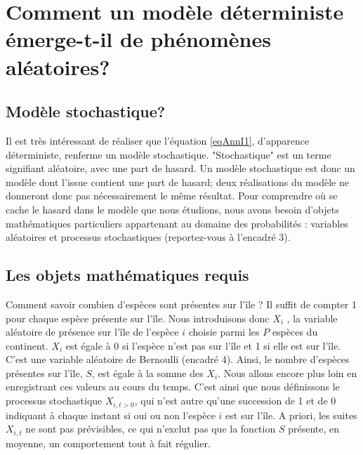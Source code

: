 \section{Comment un modèle déterministe émerge-t-il de phénomènes aléatoires?}

\subsection{Modèle stochastique?}
Il est très intéressant de réaliser que l'équation \eqref{eqAnnI1}, d'apparence déterministe, renferme un modèle stochastique. "Stochastique" est un terme signifiant aléatoire, avec une part de hasard. Un modèle stochastique est donc un modèle dont l'issue contient une part de hasard; deux réalisations du modèle ne donneront donc pas nécessairement le même résultat. Pour comprendre où se cache le hasard dans le modèle que nous étudions, nous avons besoin d'objets mathématiques particuliers appartenant au domaine des probabilités : variables aléatoires et processus stochastiques (reportez-vous à l'encadré 3).

\subsection{Les objets mathématiques requis}
Comment savoir combien d’espèces sont présentes sur l’île ? Il suffit de compter 1 pour chaque espèce présente sur l’île. Nous introduisons donc $X_i$ , la variable aléatoire de présence sur l’île de l’espèce $i$ choisie parmi les $P$ espèces du continent. $X_i$ est égale à 0 si l’espèce n’est pas sur l’île et 1 si elle est sur l’île. C’est une variable aléatoire de Bernoulli (encadré 4). Ainsi, le nombre d’espèces présentes sur l’île, $S$, est égale à la somme des $X_i$. Nous allons encore plus loin en enregistrant ces valeurs au cours du temps. C'est ainsi que nous définissons le processus stochastique $X_{i,t>0}$, qui n'est autre qu'une succession de 1 et de 0 indiquant à chaque instant si oui ou non l'espèce $i$ est sur l'île. A priori, les suites $X_{i,t}$ ne sont pas prévisibles, ce qui n’exclut pas que la fonction $S$ présente, en moyenne, un comportement tout à fait régulier.


